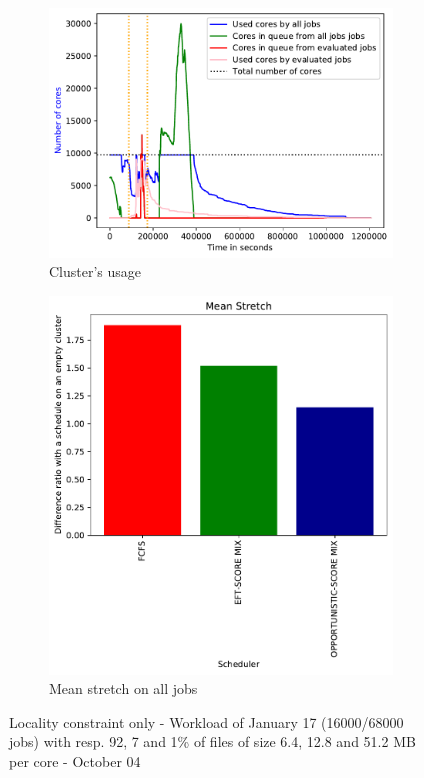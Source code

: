 \documentclass[a4paper]{article}
\begin{document}
\begin{figure}[H]\centering
\begin{subfigure}[b]{0.4\linewidth}\centering\includegraphics[width=1\linewidth]{MBSS/plot/2022-01-17->2022-01-17_V9271_Fcfs_Used_nodes_450_128_32_256_4_1024.pdf}\caption{Cluster's usage}\end{subfigure}
\begin{subfigure}[b]{0.4\linewidth}\centering\includegraphics[width=0.9\linewidth]{MBSS/plot/Results_FCFS_Score_Adaptative_Multiplier_2022-01-17->2022-01-17_V9271_Mean_Stretch_450_128_32_256_4_1024.pdf}\caption{Mean stretch on all jobs}\end{subfigure}
\caption{Locality constraint only - Workload of January 17 (16000/68000 jobs) with resp. 92, 7 and 1\% of files of size 6.4, 12.8 and 51.2 MB per core - October 04}\end{figure}
\end{document}
